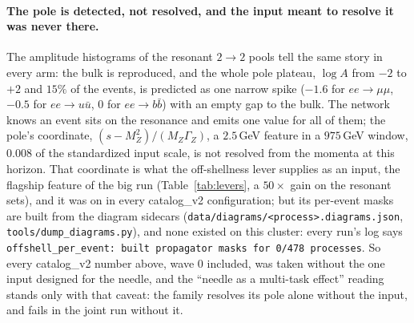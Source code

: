 \documentclass[11pt]{article}
\newcommand{\code}[1]{\texttt{#1}}
\begin{document}
\paragraph{The pole is detected, not resolved, and the input meant to resolve it was never
there.} The amplitude histograms of the resonant $2\to2$ pools tell the same story in every
arm: the bulk is reproduced, and the whole pole plateau, $\log A$ from $-2$ to $+2$ and
$15\%$ of the events, is predicted as one narrow spike ($-1.6$ for $ee\to\mu\mu$, $-0.5$ for
$ee\to u\bar u$, $0$ for $ee\to b\bar b$) with an empty gap to the bulk. The network knows
an event sits on the resonance and emits one value for all of them; the pole's coordinate,
$(s-M_Z^2)/(M_Z\Gamma_Z)$, a $2.5$\,GeV feature in a $975$\,GeV window, $0.008$ of the
standardized input scale, is not resolved from the momenta at this horizon. That coordinate
is what the off-shellness lever supplies as an input, the flagship feature of the big run
(Table~\ref{tab:levers}, a $50\times$ gain on the resonant sets), and it was on in every
catalog\_v2 configuration; but its per-event masks are built from the diagram sidecars
(\code{data/diagrams/<process>.diagrams.json}, \code{tools/dump\_diagrams.py}), and none
existed on this cluster: every run's log says \code{offshell\_per\_event: built propagator
masks for 0/478 processes}. So every catalog\_v2 number above, wave 0 included, was taken
without the one input designed for the needle, and the ``needle as a multi-task effect''
reading stands only with that caveat: the family resolves its pole alone without the
input, and fails in the joint run without it.
\end{document}
